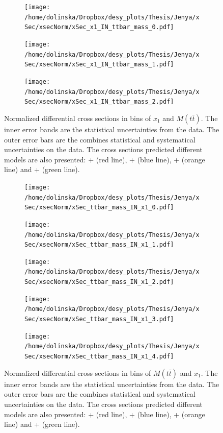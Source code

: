 \begin{figure}[p]
\centering
\begin{subfigure}
  \centering
  \texttt{[image: /home/dolinska/Dropbox/desy\_plots/Thesis/Jenya/xSec/xsecNorm/xSec\_x1\_IN\_ttbar\_mass\_0.pdf]}
\end{subfigure}
\begin{subfigure}
  \centering
  \texttt{[image: /home/dolinska/Dropbox/desy\_plots/Thesis/Jenya/xSec/xsecNorm/xSec\_x1\_IN\_ttbar\_mass\_1.pdf]}
\end{subfigure}
\begin{subfigure}
  \centering
  \texttt{[image: /home/dolinska/Dropbox/desy\_plots/Thesis/Jenya/xSec/xsecNorm/xSec\_x1\_IN\_ttbar\_mass\_2.pdf]}
\end{subfigure}
\caption{Normalized differential cross sections in bins of  $x_{1}$ and $M(t\bar{t})$. The inner error bands are the statistical uncertainties from the data.
         The outer error bars are the combines statistical and systematical uncertainties on the data. The cross sections predicted different models are also presented:
         \MG + \PYTHIA (red line), \Powheg + \PYTHIA (blue line), \Powheg + \HERWIG (orange line) and \MCNLO + \HERWIG (green line).}
\label{fig:XS_2D_x1_Mtt}
\end{figure}
\begin{figure}
\centering
\begin{subfigure}
  \centering
  \texttt{[image: /home/dolinska/Dropbox/desy\_plots/Thesis/Jenya/xSec/xsecNorm/xSec\_ttbar\_mass\_IN\_x1\_0.pdf]}
\end{subfigure}
\begin{subfigure}
  \centering
  \texttt{[image: /home/dolinska/Dropbox/desy\_plots/Thesis/Jenya/xSec/xsecNorm/xSec\_ttbar\_mass\_IN\_x1\_1.pdf]}
\end{subfigure}
\begin{subfigure}
  \centering
  \texttt{[image: /home/dolinska/Dropbox/desy\_plots/Thesis/Jenya/xSec/xsecNorm/xSec\_ttbar\_mass\_IN\_x1\_2.pdf]}
\end{subfigure}
\begin{subfigure}
  \centering
  \texttt{[image: /home/dolinska/Dropbox/desy\_plots/Thesis/Jenya/xSec/xsecNorm/xSec\_ttbar\_mass\_IN\_x1\_3.pdf]}
\end{subfigure}
\begin{subfigure}
  \centering
  \texttt{[image: /home/dolinska/Dropbox/desy\_plots/Thesis/Jenya/xSec/xsecNorm/xSec\_ttbar\_mass\_IN\_x1\_4.pdf]}
\end{subfigure}
\caption{Normalized differential cross sections in bins of $M(t\bar{t})$ and  $x_{1}$. The inner error bands are the statistical uncertainties from the data.
         The outer error bars are the combines statistical and systematical uncertainties on the data. The cross sections predicted different models are also presented:
         \MG + \PYTHIA (red line), \Powheg + \PYTHIA (blue line), \Powheg + \HERWIG (orange line) and \MCNLO + \HERWIG (green line).}
\label{fig:XS_2D_x1_Mtt1}
\end{figure}

